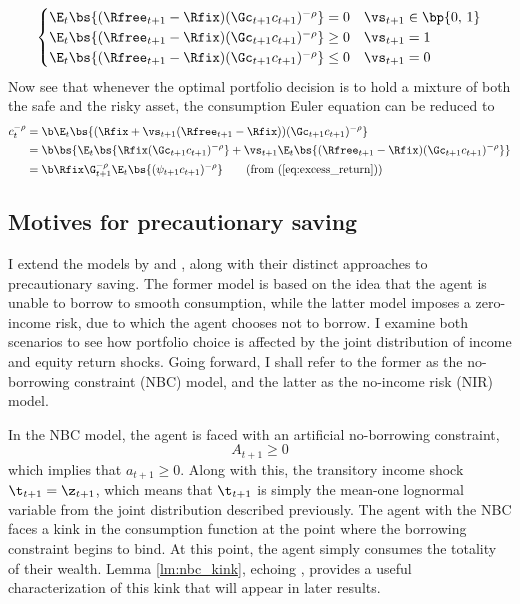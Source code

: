 \begin{equation}\label{eq:excess_return}
    \begin{cases}
        \E_{t}\bs{(\Rfree_{t+1} - \Rfix)(\Gc_{t+1}c_{t+1})^{-\rho}} = 0 & \vs_{t+1} \in \bp{0,\,1}\\
        \E_{t}\bs{(\Rfree_{t+1} - \Rfix)(\Gc_{t+1}c_{t+1})^{-\rho}} \geq 0 & \vs_{t+1} = 1\\
        \E_{t}\bs{(\Rfree_{t+1} - \Rfix)(\Gc_{t+1}c_{t+1})^{-\rho}} \leq 0 & \vs_{t+1} = 0
    \end{cases}
\end{equation}
Now see that whenever the optimal portfolio decision is to hold a mixture of both the safe and the risky asset, the consumption Euler equation can be reduced to
\begin{align*}
    c_{t}^{-\rho} &= \b \E_{t}\bs{(\Rfix + \vs_{t+1}(\Rfree_{t+1} - \Rfix))(\Gc_{t+1}c_{t+1})^{-\rho}}\\
    &= \b \bs{\E_{t}\bs{\Rfix(\Gc_{t+1}c_{t+1})^{-\rho}} + \vs_{t+1}\E_{t}\bs{(\Rfree_{t+1} - \Rfix)(\Gc_{t+1}c_{t+1})^{-\rho}}}\\
    &= \b\Rfix\G_{t+1}^{-\rho}\E_{t}\bs{(\psi_{t+1}c_{t+1})^{-\rho}} \tag{from (\ref{eq:excess_return})}
\end{align*}

\subsection{Motives for precautionary saving}\label{motives}

I extend the models by \citet{Deaton1991} and \citet{Carroll1992}, along with their distinct approaches to precautionary saving. The former model is based on the idea that the agent is unable to borrow to smooth consumption, while the latter model imposes a zero-income risk, due to which the agent chooses not to borrow. I examine both scenarios to see how portfolio choice is affected by the joint distribution of income and equity return shocks. Going forward, I shall refer to the former as the no-borrowing constraint (NBC) model, and the latter as the no-income risk (NIR) model.

In the NBC model, the agent is faced with an artificial no-borrowing constraint,
\[
A_{t+1} \geq 0
\]
which implies that $a_{t+1} \geq 0$. Along with this, the transitory income shock $\t_{t+1} = \z_{t+1}$, which means that $\t_{t+1}$ is simply the mean-one lognormal variable from the joint distribution described previously. The agent with the NBC faces a kink in the consumption function at the point where the borrowing constraint begins to bind. At this point, the agent simply consumes the totality of their wealth. Lemma \ref{lm:nbc_kink}, echoing \citet{Deaton1991}, provides a useful characterization of this kink that will appear in later results.

